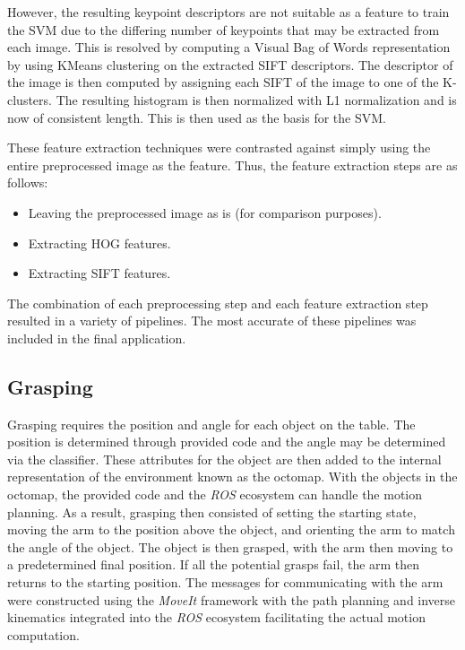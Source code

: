 \documentclass[letterpaper, 10 pt, conference]{conf/ieeeconf}  %
\begin{document}
However, the resulting keypoint descriptors are not suitable as a feature to
train the SVM due to the differing number of keypoints that may be extracted
from each image. This is resolved by computing a Visual Bag of Words representation
by using KMeans clustering on the extracted SIFT descriptors. The descriptor of
the image is then computed by assigning each SIFT of the image to one of the
K-clusters. The resulting histogram is then normalized with L1 normalization and
is now of consistent length. This is then used as the basis for the SVM.

These feature extraction techniques were contrasted against simply using the
entire preprocessed image as the feature. Thus, the feature extraction steps are
as follows:\\
\begin{itemize}
\item Leaving the preprocessed image as is (for comparison purposes).
\item Extracting HOG features.
\item Extracting SIFT features.
\end{itemize}

The combination of each preprocessing step and each feature extraction step
resulted in a variety of pipelines. The most accurate of these pipelines was
included in the final application.

\subsection{Grasping} %
Grasping requires the position and angle for each object on the table. The
position is determined through provided code and the angle may be determined via
the classifier. These attributes for the object are then added to the internal
representation of the environment known as the octomap. With the objects in the
octomap, the provided code and the \textit{ROS} ecosystem can handle the motion
planning. As a result, grasping then consisted of setting the starting state,
moving the arm to the position above the object, and orienting the arm to match
the angle of the object. The object is then grasped, with the arm then moving to
a predetermined final position. If all the potential grasps fail, the arm then
returns to the starting position. The messages for communicating with the arm
were constructed using the \textit{MoveIt} framework with the path planning and
inverse kinematics integrated into the \textit{ROS} ecosystem facilitating the
actual motion computation.
\end{document}
